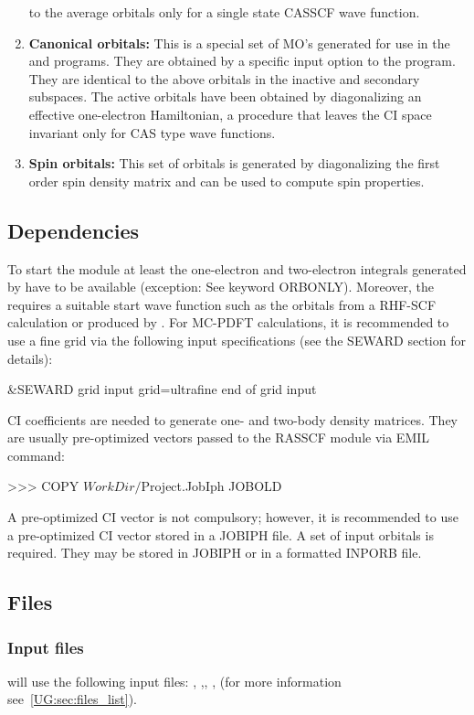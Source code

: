 \begin{enumerate}
to the average orbitals only for a single state CASSCF wave function.
\item
{\bf Canonical orbitals:}
This is a special set of MO's generated for use in the
 and  programs.
They are obtained by a specific input option to the
 program. They are identical to the above
orbitals in the inactive and secondary subspaces. The active orbitals
have been obtained by diagonalizing an effective one-{}electron
Hamiltonian, a procedure that leaves the CI space invariant only for
CAS type wave functions.
\item
{\bf Spin orbitals:}
This set of orbitals is generated by diagonalizing the first order
spin density matrix and can be used to compute spin properties.
\end{enumerate}

\subsection{Dependencies}
\label{UG:sec:rasscf_dependencies}
To start the  module at least the one{-}electron
and two{-}electron integrals generated by  have to
be available (exception: See keyword ORBONLY).  Moreover, the
 requires a suitable start wave function such as the
orbitals from a RHF{-}SCF calculation or produced by .
For MC-PDFT calculations, it is recommended to use a fine grid via the following input specifications (see the SEWARD section for details):
\begin{inputlisting}
&SEWARD
grid input
grid=ultrafine
end of grid input
\end{inputlisting}
CI coefficients are needed to generate one- and two-body density matrices. They are usually pre-optimized vectors passed to the RASSCF module via EMIL command:
\begin{inputlisting}
>>> COPY $WorkDir/$Project.JobIph JOBOLD
\end{inputlisting}
A pre-optimized CI vector is not compulsory; however, it is recommended to use a pre-optimized CI vector stored in a JOBIPH file.
A set of input orbitals is required. They may be stored in JOBIPH or in a formatted INPORB file.

\subsection{Files}
\label{UG:sec:rasscf_files}

\subsubsection{Input files}
\label{UG:sec:rasscf_inp_files}
 will use the following input
files: , ,, ,
(for more information see~\ref{UG:sec:files_list}).

